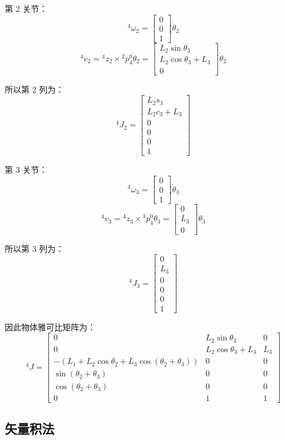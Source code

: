 {第 2 关节：
$$
{}^4\omega_2=
\begin{bmatrix}
0 \\ 0 \\ 1
\end{bmatrix}
\dot\theta_2
$$
$$
{}^4v_2=
{}^4z_2\times{}^2p_4^0\dot\theta_2 = 
\begin{bmatrix}
L_2\sin\theta_3 \\
L_2\cos\theta_3+L_3 \\
0
\end{bmatrix}
\dot\theta_2
$$

所以第 2 列为：
$$
{}^4J_2=
\begin{bmatrix}
L_2s_3 \\
L_2c_3+L_3 \\
0 \\
0 \\
0 \\
1
\end{bmatrix}
$$

第 3 关节：
$$
{}^4\omega_3=
\begin{bmatrix}
0 \\ 0 \\ 1
\end{bmatrix}
\dot\theta_3
$$
$$
{}^4v_3=
{}^4z_3\times{}^3p_4^0\dot\theta_3 = 
\begin{bmatrix}
0 \\
L_3 \\
0
\end{bmatrix}
\dot\theta_3
$$

所以第 3 列为：
$$
{}^4J_3=
\begin{bmatrix}
0 \\
L_3 \\
0 \\
0 \\
0 \\
1
\end{bmatrix}
$$

因此物体雅可比矩阵为：
$$
{}^4J=
\begin{bmatrix}
0 & L_2\sin\theta_3 & 0 \\
0 & L_2\cos\theta_3+L_3 & L_3 \\
-\left(L_1+L_2\cos\theta_2+L_3\cos(\theta_2+\theta_3)\right) & 0 & 0 \\
\sin(\theta_2+\theta_3) & 0 & 0 \\
\cos(\theta_2+\theta_3) & 0 & 0 \\
0 & 1 & 1
\end{bmatrix}
$$
}


\subsection{矢量积法}

